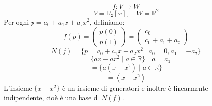 \documentclass[a4paper]{article}
\theoremstyle{break}
\theoremstyle{break}
\theoremstyle{break}
\theoremstyle{break}
\begin{document}
\begin{example}
  \[
    f: V \to W
    \] 
  \[
    V = \mathbb{R}_2[x], \quad W = \mathbb{R}^2
  \] 
  Per ogni \( p = a_0 + a_1x + a_2x^2 \), definiamo:
  \[
  f(p) = \begin{pmatrix} 
    p(0)\\
    p(1)
  \end{pmatrix} 
  =
  \begin{pmatrix} 
    a_0\\
    a_0 + a_1 + a_2
  \end{pmatrix}
  \] 
  \[
  N(f) = \{p = a_0 + a_1x + a_2x^2 \;|\; a_0 = 0, a_1 = - a_2 \}
  \] 
  \[
   = \{ax - ax^2 \;|\; a \in \mathbb{R}\} \quad a = a_1
  \] 
  \[
    = \{a(x-x^2) \;|\; a \in \mathbb{R}\} 
  \] 
  \[
   = \left< x-x^2 \right>
  \] 
  L'insieme \( \{x-x^2\}  \) è un insieme di generatori e inoltre è linearmente 
  indipendente, cioè è una base di \( N(f) \).


\end{example}
\end{document}
